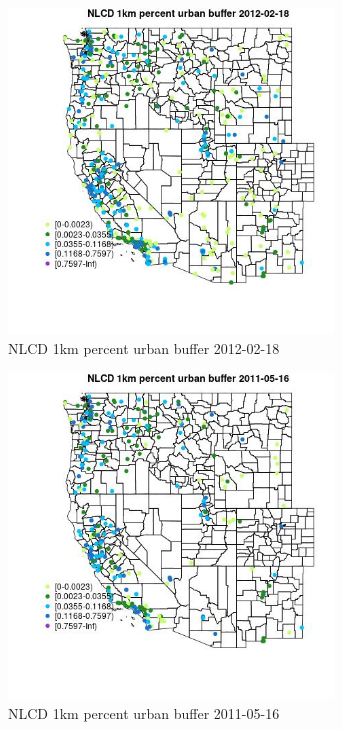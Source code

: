\begin{figure} 
\centering  
\includegraphics[width=0.77\textwidth]{Code_Outputs/Report_ML_input_PM25_Step4_part_f_de_duplicated_aves_prioritize_24hr_obswNAs_MapObsNLCD_1km_percent_urban_buffer2012-02-18.jpg} 
\caption{\label{fig:Report_ML_input_PM25_Step4_part_f_de_duplicated_aves_prioritize_24hr_obswNAsMapObsNLCD_1km_percent_urban_buffer2012-02-18}NLCD 1km percent urban buffer 2012-02-18} 
\end{figure} 
 

\begin{figure} 
\centering  
\includegraphics[width=0.77\textwidth]{Code_Outputs/Report_ML_input_PM25_Step4_part_f_de_duplicated_aves_prioritize_24hr_obswNAs_MapObsNLCD_1km_percent_urban_buffer2011-05-16.jpg} 
\caption{\label{fig:Report_ML_input_PM25_Step4_part_f_de_duplicated_aves_prioritize_24hr_obswNAsMapObsNLCD_1km_percent_urban_buffer2011-05-16}NLCD 1km percent urban buffer 2011-05-16} 
\end{figure} 
 

